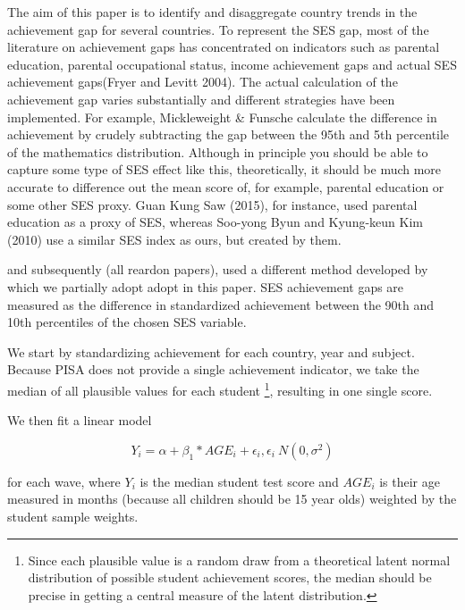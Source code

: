 \documentclass[11pt, a4paper]{article}\usepackage[]{graphicx}\usepackage[]{color}
\begin{document}
The aim of this paper is to identify and disaggregate country trends in the achievement gap for several countries. To represent the SES gap, most of the literature on achievement gaps has concentrated on indicators such as parental education, parental occupational status, income achievement gaps and actual SES achievement gaps(Fryer and Levitt 2004). The actual calculation of the achievement gap varies substantially and different strategies have been implemented. For example, Mickleweight \& Funsche calculate the difference in achievement by crudely subtracting the gap between the 95th and 5th percentile of the mathematics distribution. Although in principle you should be able to capture some type of SES effect like this, theoretically, it should be much more accurate to difference out the mean score of, for example, parental education or some other SES proxy. Guan Kung Saw (2015), for instance, used parental education as a proxy of SES, whereas Soo-yong Byun and Kyung-keun Kim (2010) use a similar SES index as ours, but created by them.

\citet{reardon2011} and subsequently (all reardon papers), used a different method developed by \citet{reardon2011} which we partially adopt adopt in this paper. SES achievement gaps are measured as the difference in standardized achievement between the 90th and 10th percentiles of the chosen SES variable.

We start by standardizing achievement for each country, year and subject. Because PISA does not provide a single achievement indicator, we take the median of all plausible values for each student \footnote{Since each plausible value is a random draw from a theoretical latent normal distribution of possible student achievement scores, the median should be precise in getting a central measure of the latent distribution.}, resulting in one single score.

We then fit a linear model

\begin{equation}
Y_i = \alpha + \beta_1 * AGE_i + \epsilon_i, \epsilon_i ~ N(0, \sigma^2)
\end{equation}

for each wave,  where \begin{math}Y_i\end{math} is the median student test score and \begin{math}AGE_i\end{math} is their age measured in months (because all children should be 15 year olds) weighted by the student sample weights.
\end{document}
